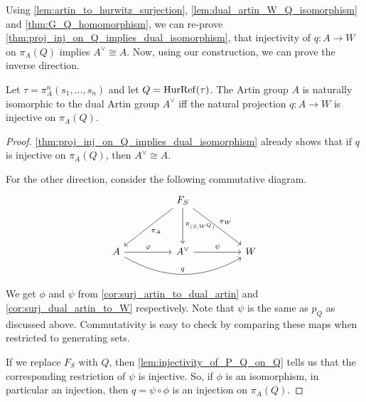 Using \cref{lem:artin_to_hurwitz_surjection}, \cref{lem:dual_artin_W_Q_isomorphism} and \cref{thm:G_Q_homomorphism}, we can re-prove \cref{thm:proj_inj_on_Q_implies_dual_isomorphism}, that injectivity of $q \colon A \to W$ on  $\pi_A(Q)$ implies  $A^\vee \cong A$.
Now, using our construction, we can prove the inverse direction.
\begin{theorem}
	\label{thm:proj_inj_on_Q_iff_dual_isomorphism}
	Let $\tau = \pi^n_A(s_1,\ldots,s_n)$ and let $Q = \operatorname{HurRef}(\tau)$.
	The Artin group $A$ is naturally isomorphic to the dual Artin group  $A^\vee$ iff the natural projection $q \colon A \to W$ is injective on  $\pi_A(Q)$.
\end{theorem}
\begin{proof}
	\cref{thm:proj_inj_on_Q_implies_dual_isomorphism} already shows that if $q$ is injective on $\pi_A(Q)$, then $A^\vee \cong A$.

	For the other direction, consider the following commutative diagram.
	\begin{equation*}
		\begin{tikzcd}
			&& {F_S} \\
			\\
			A && {A^\vee} && W
			\arrow["{\pi_A}", from=1-3, to=3-1]
			\arrow["{\pi_{(S,W^Q)}}", from=1-3, to=3-3]
			\arrow["{\pi_W}", from=1-3, to=3-5]
			\arrow["\phi", from=3-1, to=3-3]
			\arrow["\psi", from=3-3, to=3-5]
			\arrow["q", from=3-1, to=3-5, bend right=30]
		\end{tikzcd}
	\end{equation*}
	We get $\phi$ and $\psi$ from \cref{cor:surj_artin_to_dual_artin} and \cref{cor:surj_dual_artin_to_W} respectively.
	Note that  $\psi$ is the same as $p_Q$ as discussed above.
	Commutativity is easy to check by comparing these maps when restricted to generating sets.

	If we replace $F_S$ with $Q$, then \cref{lem:injectivity_of_P_Q_on_Q} tells us that the corresponding restriction of $\psi$ is injective.
	So, if $\phi$ is an isomorphism, in particular an injection, then $q = \psi \circ \phi$ is an injection on  $\pi_A(Q)$.
\end{proof}
